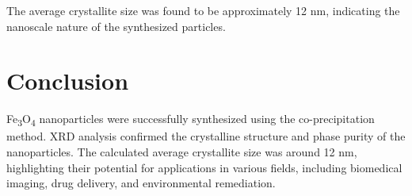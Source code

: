 \documentclass[12pt]{article}
\begin{document}
The average crystallite size was found to be approximately 12 nm, indicating the nanoscale nature of the synthesized particles.

\section{Conclusion}
Fe\textsubscript{3}O\textsubscript{4} nanoparticles were successfully synthesized using the co-precipitation method. XRD analysis confirmed the crystalline structure and phase purity of the nanoparticles. The calculated average crystallite size was around 12 nm, highlighting their potential for applications in various fields, including biomedical imaging, drug delivery, and environmental remediation.
\end{document}
